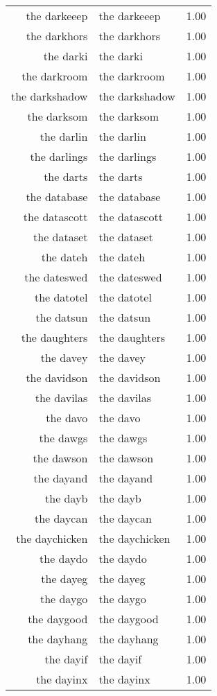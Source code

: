 \begin{table}[ht]
\begin{tabular}{rlr}
  the darkeeep & the darkeeep & 1.00 \\ 
  the darkhors & the darkhors & 1.00 \\ 
  the darki & the darki & 1.00 \\ 
  the darkroom & the darkroom & 1.00 \\ 
  the darkshadow & the darkshadow & 1.00 \\ 
  the darksom & the darksom & 1.00 \\ 
  the darlin & the darlin & 1.00 \\ 
  the darlings & the darlings & 1.00 \\ 
  the darts & the darts & 1.00 \\ 
  the database & the database & 1.00 \\ 
  the datascott & the datascott & 1.00 \\ 
  the dataset & the dataset & 1.00 \\ 
  the dateh & the dateh & 1.00 \\ 
  the dateswed & the dateswed & 1.00 \\ 
  the datotel & the datotel & 1.00 \\ 
  the datsun & the datsun & 1.00 \\ 
  the daughters & the daughters & 1.00 \\ 
  the davey & the davey & 1.00 \\ 
  the davidson & the davidson & 1.00 \\ 
  the davilas & the davilas & 1.00 \\ 
  the davo & the davo & 1.00 \\ 
  the dawgs & the dawgs & 1.00 \\ 
  the dawson & the dawson & 1.00 \\ 
  the dayand & the dayand & 1.00 \\ 
  the dayb & the dayb & 1.00 \\ 
  the daycan & the daycan & 1.00 \\ 
  the daychicken & the daychicken & 1.00 \\ 
  the daydo & the daydo & 1.00 \\ 
  the dayeg & the dayeg & 1.00 \\ 
  the daygo & the daygo & 1.00 \\ 
  the daygood & the daygood & 1.00 \\ 
  the dayhang & the dayhang & 1.00 \\ 
  the dayif & the dayif & 1.00 \\ 
  the dayinx & the dayinx & 1.00 \\ 

\end{tabular}
\end{table}
